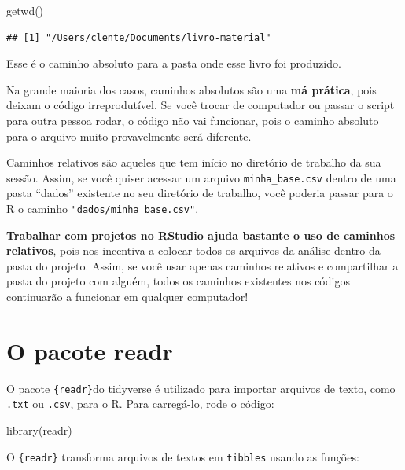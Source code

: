 \documentclass[
]{book}
\newenvironment{Shaded}{\begin{snugshade}}{\end{snugshade}}
\newcommand{\FunctionTok}[1]{\textcolor[rgb]{0.00,0.00,0.00}{#1}}
\newcommand{\NormalTok}[1]{#1}
\begin{document}
\begin{Shaded}
\begin{Highlighting}[]
\FunctionTok{getwd}\NormalTok{()}
\end{Highlighting}
\end{Shaded}

\begin{verbatim}
## [1] "/Users/clente/Documents/livro-material"
\end{verbatim}

Esse é o caminho absoluto para a pasta onde esse livro foi produzido.

Na grande maioria dos casos, caminhos absolutos são uma \textbf{má prática}, pois deixam o código irreprodutível. Se você trocar de computador ou passar o script para outra pessoa rodar, o código não vai funcionar, pois o caminho absoluto para o arquivo muito provavelmente será diferente.

Caminhos relativos são aqueles que tem início no diretório de trabalho da sua sessão. Assim, se você quiser acessar um arquivo \texttt{minha\_base.csv} dentro de uma pasta ``dados'' existente no seu diretório de trabalho, você poderia passar para o R o caminho \texttt{"dados/minha\_base.csv"}.

\textbf{Trabalhar com projetos no RStudio ajuda bastante o uso de caminhos relativos}, pois nos incentiva a colocar todos os arquivos da análise dentro da pasta do projeto. Assim, se você usar apenas caminhos relativos e compartilhar a pasta do projeto com alguém, todos os caminhos existentes nos códigos continuarão a funcionar em qualquer computador!

\hypertarget{readr}{%
\section{O pacote readr}\label{readr}}

O pacote \texttt{\{readr\}}do tidyverse é utilizado para importar arquivos de texto, como \texttt{.txt} ou \texttt{.csv}, para o R. Para carregá-lo, rode o código:

\begin{Shaded}
\begin{Highlighting}[]
\FunctionTok{library}\NormalTok{(readr)}
\end{Highlighting}
\end{Shaded}

O \texttt{\{readr\}} transforma arquivos de textos em \texttt{tibbles} usando as funções:
\end{document}
